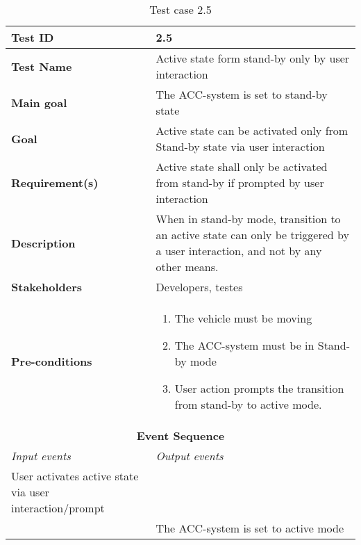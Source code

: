 \begin{table}[H]
\centering
\begin{tabularx}{\linewidth}{X|X}
    \hline
    \textbf{Test ID} & 2.5 \\
    \hline
    \textbf{Test Name} & Active state form stand-by only by user interaction  \\
    \hline
    \textbf{Main goal} & The ACC-system is set to stand-by state  \\
    \hline
    \textbf{Goal} & Active state can be activated only from Stand-by state via user interaction \\
    \hline
    \textbf{Requirement(s)} & Active state shall only be activated from stand-by if prompted by user interaction\\
    \hline
    \textbf{Description} & When in stand-by mode, transition to an active state can only be triggered by a user interaction, and not by any other means.\\
    \hline
    \textbf{Stakeholders} & Developers, testes \\
    \hline
    \textbf{Pre-conditions} & 
    \begin{enumerate}
        \item The vehicle must be moving
        \item The ACC-system must be in Stand-by mode
        \item User action prompts the transition from stand-by to active mode.
    \end{enumerate}\\
    \hline
    \multicolumn{2}{c}{\textbf{Event Sequence}} \\
    \hline
    \textit{Input events} & \textit{Output events} \\
    \hline
    User activates active state via user interaction/prompt &  \\
    \hline
     & The ACC-system is set to active mode\\
    \hline
\end{tabularx}
\caption{\label{tab_case2_5} Test case 2.5}
\end{table}



